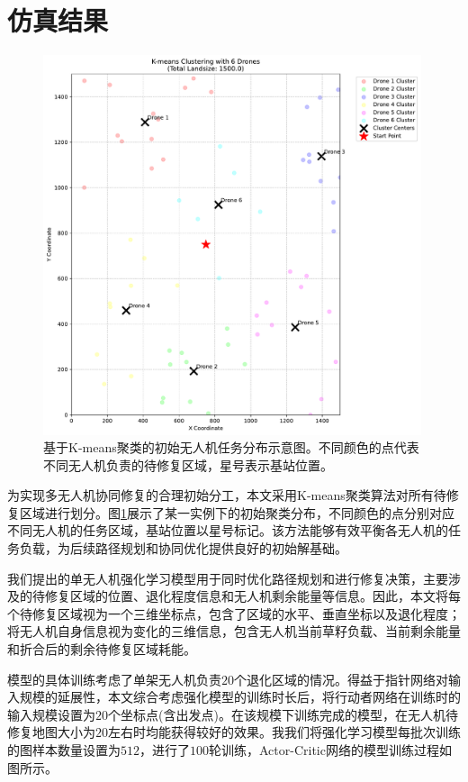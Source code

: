 \documentclass[AutoFakeBold]{LZUThesis}
\begin{document}
\section{仿真结果}

\begin{figure}[H]
	\centering
	\includegraphics[width=0.99\textwidth]{figures/cvrp_60_500_6_kmeans_clusters.pdf}
	\caption{基于K-means聚类的初始无人机任务分布示意图。不同颜色的点代表不同无人机负责的待修复区域，星号表示基站位置。}
	\label{fig:kmeans_initial_distribution}
\end{figure}

为实现多无人机协同修复的合理初始分工，本文采用K-means聚类算法对所有待修复区域进行划分。图\ref{fig:kmeans_initial_distribution}展示了某一实例下的初始聚类分布，不同颜色的点分别对应不同无人机的任务区域，基站位置以星号标记。该方法能够有效平衡各无人机的任务负载，为后续路径规划和协同优化提供良好的初始解基础。

我们提出的单无人机强化学习模型用于同时优化路径规划和进行修复决策，主要涉及的待修复区域的位置、退化程度信息和无人机剩余能量等信息。因此，本文将每个待修复区域视为一个三维坐标点，包含了区域的水平、垂直坐标以及退化程度；将无人机自身信息视为变化的三维信息，包含无人机当前草籽负载、当前剩余能量和折合后的剩余待修复区域耗能。

模型的具体训练考虑了单架无人机负责$20$个退化区域的情况。得益于指针网络对输入规模的延展性，本文综合考虑强化模型的训练时长后，将行动者网络在训练时的输入规模设置为$20$个坐标点(含出发点)。在该规模下训练完成的模型，在无人机待修复地图大小为$20$左右时均能获得较好的效果。我我们将强化学习模型每批次训练的图样本数量设置为$512$，进行了$100$轮训练，Actor-Critic网络的模型训练过程如图所示。
\end{document}
